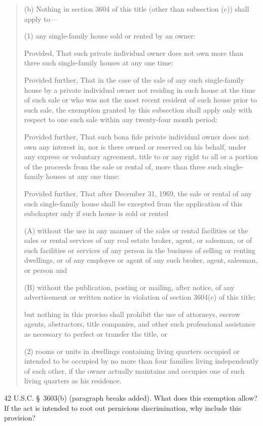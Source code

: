 \begin{quotation}
(b) Nothing in section 3604 of this title (other than subsection (c)) shall
apply to---
\begin{statute}
\item (1) any single-family house sold or rented by an owner:
\begin{statute}
\item Provided, That such private individual owner does not own more than three
such single-family houses at any one time:
\item Provided further, That in the case of the sale of any such single-family
house by a private individual owner not residing in such house at the time of
such sale or who was not the most recent resident of such house prior to such
sale, the exemption granted by this subsection shall apply only with respect to
one such sale within any twenty-four month period:
\item Provided further, That such bona fide private individual owner does not
own any interest in, nor is there owned or reserved on his behalf, under any
express or voluntary agreement, title to or any right to all or a portion of the
proceeds from the sale or rental of, more than three such single-family houses
at any one time:
\item Provided further, That after December 31, 1969, the sale or rental of any
such single-family house shall be excepted from the application of this
subchapter only if such house is sold or rented
\begin{statute}
\item (A) without the use in any manner of the sales or rental facilities or the
sales or rental services of any real estate broker, agent, or salesman, or of
such facilities or services of any person in the business of selling or renting
dwellings, or of any employee or agent of any such broker, agent, salesman, or
person and
\item (B) without the publication, posting or mailing, after notice, of any
advertisement or written notice in violation of section 3604(c) of this title;
\end{statute}
but nothing in this proviso shall prohibit the use of attorneys, escrow agents,
abstractors, title companies, and other such professional assistance as
necessary to perfect or transfer the title, or
\end{statute}

\item (2) rooms or units in dwellings containing living quarters occupied or
intended to be occupied by no more than four families living independently of
each other, if the owner actually maintains and occupies one of such living
quarters as his residence.
\end{statute}
\end{quotation}
42 U.S.C. \S~3603(b) (paragraph breaks added).
What does this exemption allow?  If the act is intended to root out pernicious
discrimination, why include this provision?  

